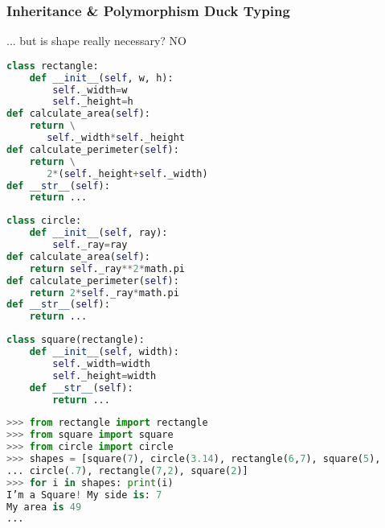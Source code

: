 \subsubsection{Inheritance & Polymorphism Duck Typing}

... but is shape really necessary? NO

\begin{lstlisting}[language=Python]
class rectangle:
	def __init__(self, w, h):
		self._width=w
		self._height=h
def calculate_area(self):
	return \
	   self._width*self._height
def calculate_perimeter(self):
	return \
	   2*(self._height+self._width)
def __str__(self):
	return ...
\end{lstlisting}

\begin{lstlisting}[language=Python]
class circle:
	def __init__(self, ray):
		self._ray=ray
def calculate_area(self):
	return self._ray**2*math.pi
def calculate_perimeter(self):
	return 2*self._ray*math.pi
def __str__(self):
	return ...
\end{lstlisting}

\begin{lstlisting}[language=Python]
class square(rectangle): 
	def __init__(self, width):
		self._width=width
		self._height=width
	def __str__(self):
		return ...
\end{lstlisting}

\begin{lstlisting}[language=Python]
>>> from rectangle import rectangle
>>> from square import square
>>> from circle import circle
>>> shapes = [square(7), circle(3.14), rectangle(6,7), square(5),
... circle(.7), rectangle(7,2), square(2)]
>>> for i in shapes: print(i)
I’m a Square! My side is: 7
My area is 49
... 
\end{lstlisting}
